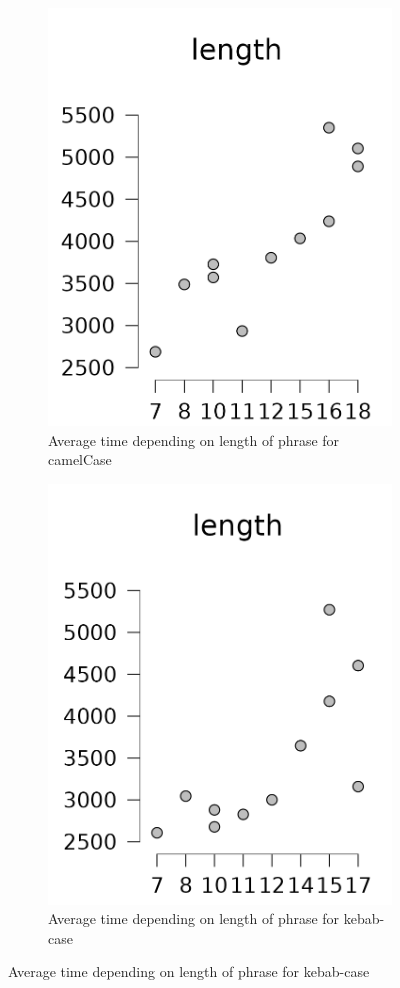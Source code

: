 \documentclass{article}
\begin{document}
\begin{figure}[h!]
    \centering
		\begin{subfigure}{0.49\textwidth}
			\includegraphics[width=.8\textwidth]{images/time_length_camel.png}
			\caption{Average time depending on length of phrase for camelCase}
		\end{subfigure}
		\begin{subfigure}{0.49\textwidth}
			\includegraphics[width=.8\textwidth]{images/time_length_kebab.png}
			\caption{Average time depending on length of phrase for kebab-case}
		\end{subfigure}
\end{figure}
\end{document}
